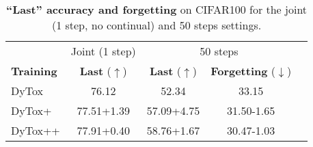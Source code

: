 \begin{table}[t]
    \centering
    \begin{tabular}{@{}l|c|ccc}
        \hline
                          & Joint (1 step)                                  & \multicolumn{2}{c}{50 steps}                                                                             \\
        \textbf{Training} & \textbf{Last} ($\uparrow$)                      & \textbf{Last} ($\uparrow$)                      & \textbf{Forgetting} ($\downarrow$)\Tstrut\Bstrut       \\
        \hline
        DyTox             & 76.12                                           & 52.34                                           & 33.15 \Tstrut                                          \\
        DyTox+            & 77.51\scriptsize{\textcolor{OliveGreen}{+1.39}} & 57.09\scriptsize{\textcolor{OliveGreen}{+4.75}} & 31.50\scriptsize{\textcolor{OliveGreen}{-1.65}}\Bstrut \\
        DyTox++           & 77.91\scriptsize{\textcolor{OliveGreen}{+0.40}} & 58.76\scriptsize{\textcolor{OliveGreen}{+1.67}} & 30.47\scriptsize{\textcolor{OliveGreen}{-1.03}}        \\
        \hline
    \end{tabular}
    \caption{\textbf{``Last'' accuracy and forgetting} on CIFAR100 for the joint (1 step, no
        continual) and 50 steps settings.}
    \label{tab:dytox_training_plusplus}
\end{table}
